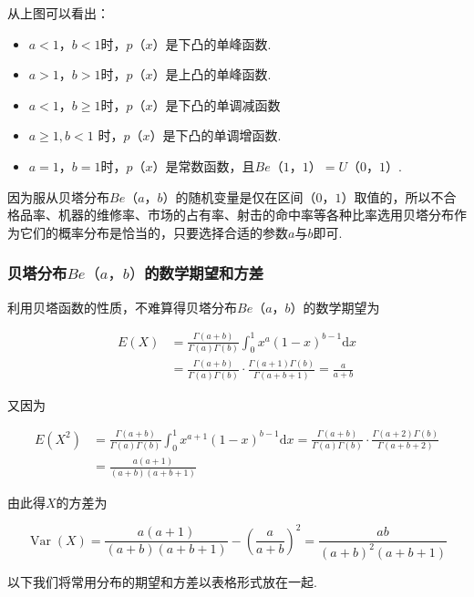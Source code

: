 从上图可以看出：
\begin{itemize}
	\item $ a<1，b<1 $时，$ p（x） $是下凸的单峰函数.
	\item $ a>1，b>1 $时，$ p（x） $是上凸的单峰函数.
	\item $ a<1，b \geqslant 1 $时，$ p（x） $是下凸的单调减函数
	\item $a \geqslant 1, b<1$ 时，$ p（x） $是下凸的单调增函数.
	\item $ a=1，b=1 $时，$ p（x） $是常数函数，且$ Be（1，1）=U（0，1） $.
\end{itemize}

因为服从贝塔分布$ Be（a，b） $的随机变量是仅在区间$ （0，1） $取值的，所以不合格品率、机器的维修率、市场的占有率、射击的命中率等各种比率选用贝塔分布作为它们的概率分布是恰当的，只要选择合适的参数$ a $与$ b $即可.

\subsubsection{贝塔分布$ Be（a，b） $的数学期望和方差}

利用贝塔函数的性质，不难算得贝塔分布$ Be（a，b） $的数学期望为

\[
\begin{aligned} E(X) &=\frac{\Gamma(a+b)}{\Gamma(a) \Gamma(b)} \int_{0}^{1} x^{a}(1-x)^{b-1} \mathrm{d} x \\ &=\frac{\Gamma(a+b)}{\Gamma(a) \Gamma(b)} \cdot \frac{\Gamma(a+1) \Gamma(b)}{\Gamma(a+b+1)}=\frac{a}{a+b} \end{aligned}
\]

又因为

\[
\begin{aligned} E\left(X^{2}\right) &=\frac{\Gamma(a+b)}{\Gamma(a) \Gamma(b)} \int_{0}^{1} x^{a+1}(1-x)^{b-1} \mathrm{d} x=\frac{\Gamma(a+b)}{\Gamma(a) \Gamma(b)} \cdot \frac{\Gamma(a+2) \Gamma(b)}{\Gamma(a+b+2)} \\ &=\frac{a(a+1)}{(a+b)(a+b+1)} \end{aligned}
\]

由此得$ X $的方差为

\[
\operatorname{Var}(X)=\frac{a(a+1)}{(a+b)(a+b+1)}-\left(\frac{a}{a+b}\right)^{2}=\frac{a b}{(a+b)^{2}(a+b+1)}
\]

以下我们将常用分布的期望和方差以表格形式放在一起.

